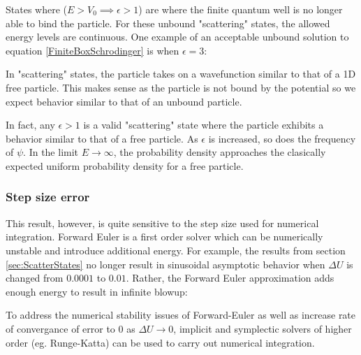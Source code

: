 \documentclass{article}
\begin{document}
States where ($E > V_0 \implies \epsilon > 1$) are where the finite quantum
well is no longer able to bind the particle. For these unbound "scattering" states,
the allowed energy levels are continuous. One example of an acceptable unbound solution to
equation \eqref{FiniteBoxSchrodinger} is when $\epsilon = 3$:

\begin{figure}[H]
\centering
{}
\end{figure}

In "scattering" states, the particle takes on a wavefunction similar to that of
a 1D free particle. This makes sense as the particle is not bound by the
potential so we expect behavior similar to that of an unbound particle.

In fact, any $\epsilon > 1$ is a valid "scattering" state where the particle
exhibits a behavior similar to that of a free particle. As $\epsilon$ is
increased, so does the frequency of $\psi$. In the limit $E \rightarrow
\infty$, the probability density approaches the clasically expected uniform
probability density for a free particle. 

\subsubsection{Step size error}\label{StepSizeError}
This result, however, is quite sensitive to the step size used for numerical
integration. Forward Euler is a first order solver which can be numerically
unstable and introduce additional energy. For example, the results from
section \ref{sec:ScatterStates} no longer result in sinusoidal asymptotic
behavior when $\Delta U$ is changed from $0.0001$ to $0.01$.  Rather, the
Forward Euler approximation adds enough energy to result in infinite blowup:

\begin{figure}[H]
\vspace{-.1in}
\centering
{}
\end{figure}

To address the numerical stability issues of Forward-Euler as well as increase
rate of convergance of error to $0$ as $\Delta U \rightarrow 0$, implicit
and symplectic solvers of higher order (eg. Runge-Katta) can be used to carry out numerical
integration.
\end{document}
